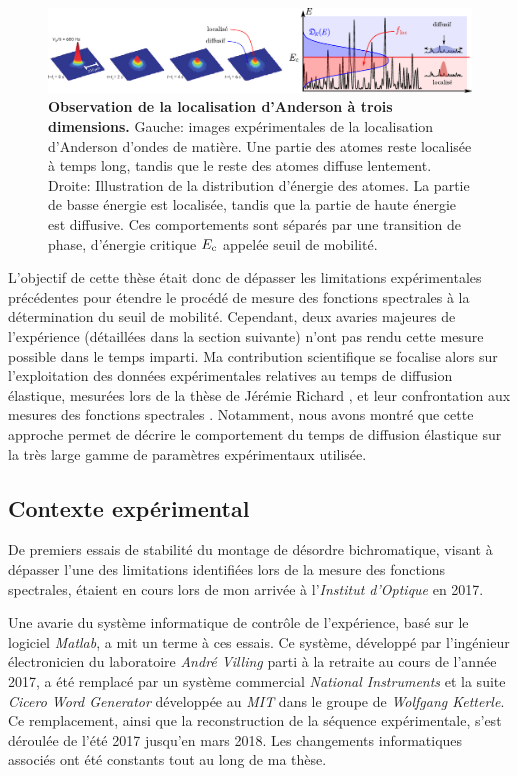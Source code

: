 \begin{figure}
\centering
\includegraphics[width=\textwidth]{Fig/Introduction/AL3D.pdf}
\caption{\textbf{Observation de la localisation d'Anderson à trois dimensions.} Gauche: images expérimentales de la localisation d'Anderson d'ondes de matière. Une partie des atomes reste localisée à temps long, tandis que le reste des atomes diffuse lentement. Droite: Illustration de la distribution d'énergie des atomes. La partie de basse énergie est localisée, tandis que la partie de haute énergie est diffusive. Ces comportements sont séparés par une transition de phase, d'énergie critique $E_{\mathrm{c}}$ appelée seuil de mobilité.}
\label{fig:AL3D}
\end{figure}

L'objectif de cette thèse était donc de dépasser les limitations expérimentales précédentes pour étendre le procédé de mesure des fonctions spectrales à la détermination du seuil de mobilité. Cependant, deux avaries majeures de l'expérience (détaillées dans la section suivante) n'ont pas rendu cette mesure possible dans le temps imparti. Ma contribution scientifique se focalise alors sur l'exploitation des données expérimentales relatives au temps de diffusion élastique, mesurées lors de la thèse de Jérémie Richard \citep{richard2015propagation}\citep{richard2019elastic}, et leur confrontation aux mesures des fonctions spectrales \citep{signoles2019ultracold}. Notamment, nous avons montré que cette approche permet de décrire le comportement du temps de diffusion élastique sur la très large gamme de paramètres expérimentaux utilisée.






\subsection*{Contexte expérimental}
De premiers essais de stabilité du montage de désordre bichromatique, visant à dépasser l'une des limitations identifiées lors de la mesure des fonctions spectrales, étaient en cours lors de mon arrivée à l'\emph{Institut d'Optique} en 2017.

Une avarie du système informatique de contrôle de l'expérience, basé sur le logiciel \emph{Matlab}, a mit un terme à ces essais. Ce système, développé par l'ingénieur électronicien du laboratoire \emph{André Villing} parti à la retraite au cours de l'année 2017, a été remplacé par un système commercial \emph{National Instruments} et la suite \emph{Cicero Word Generator} développée au \emph{MIT} dans le groupe de \emph{Wolfgang Ketterle}. Ce remplacement, ainsi que la reconstruction de la séquence expérimentale, s'est déroulée de l'été 2017 jusqu'en mars 2018. Les changements informatiques associés ont été constants tout au long de ma thèse.


